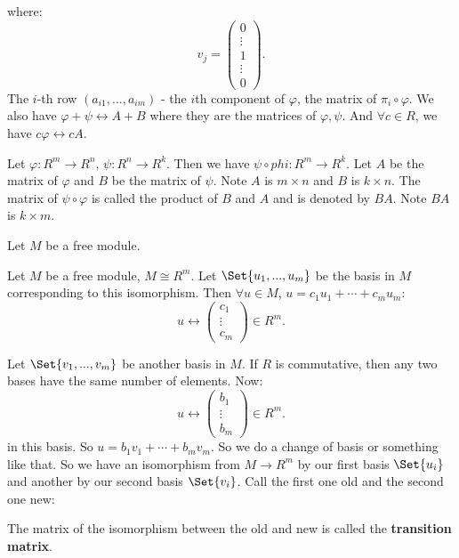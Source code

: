 \documentclass[9pt,reqno,twoside]{amsbook}
\theoremstyle{plain}
\numberwithin{section}{chapter}
\numberwithin{equation}{chapter}
\theoremstyle{definition}
\theoremstyle{remark}
\theoremstyle{plain}
\newcommand{\lpar}{\left(}
\newcommand{\rpar}{\right)}
\renewcommand{\phi}{\varphi}
\begin{document}
where:
$$
v_j = 
\lpar 
\begin{matrix}
0\\
\vdots\\
1\\
\vdots\\
0
\end{matrix} \rpar.
$$
The $i$-th row $(a_{i1},...,a_{im})$ - the $i$th component of $\phi$, the matrix of $\pi_i \circ \phi$. We also have $\phi + \psi \leftrightarrow A + B$ where they are the matrices of $\phi,\psi$. And $\forall c \in R$, we have $c \phi \leftrightarrow cA$. 

Let $\phi:R^m \to R^n$, $\psi:R^n \to R^k$. Then we have $\psi \circ phi:R^m \to R^k$. Let $A$ be the matrix of $\phi$ and $B$ be the matrix of $\psi$. Note $A$ is $m \times n$ and $B$ is $k \times n$. The matrix of $\psi \circ \phi$ is called the product of $B$ and $A$ and is denoted by $BA$. Note $BA$ is $k \times m$. 

Let $M$ be a free module. 

Let $M$ be a free module, $M \cong R^m$. Let $\Set{u_1,...,u_m}$ be the basis in $M$ corresponding to this isomorphism. Then $\forall u \in M$, $u = c_1u_1 + \cdots + c_mu_m$:
$$
u \leftrightarrow \lpar 
\begin{matrix}
c_1\\
\vdots\\
c_m
\end{matrix} \rpar \in R^m.
$$

Let $\Set{v_1,...,v_m}$ be another basis in $M$. If $R$ is commutative, then any two bases have the same number of elements. Now:
 $$
 u \leftrightarrow \lpar 
 \begin{matrix}
 b_1\\
 \vdots\\
 b_m
\end{matrix}  \rpar  \in R^m.
$$
 in this basis. So $u = b_1v_1 + \cdots + b_mv_m$. So we do a change of basis or something like that. So we have an isomorphism from $M \to R^m$ by our first basis $\Set{u_i}$ and another by our second basis $\Set{v_i}$. Call the first one old and the second one new:
 \begin{center}
\end{center}
The matrix of the isomorphism between the old and new is called the \textbf{transition matrix}. 
\end{document}
